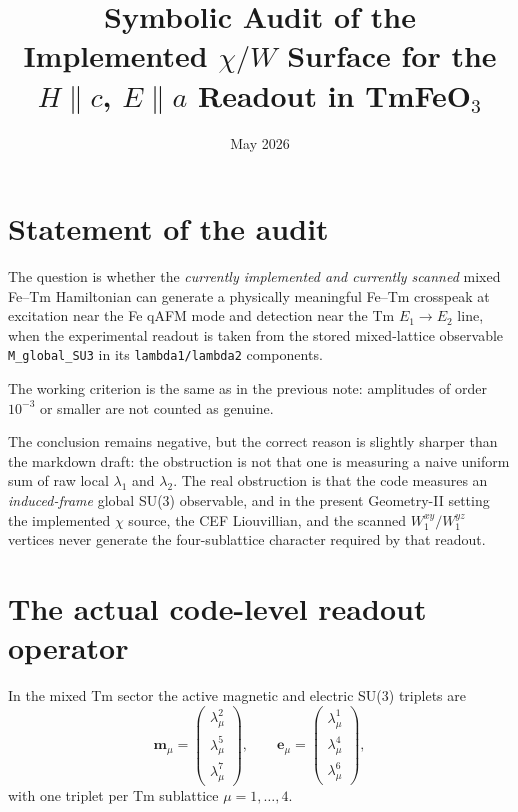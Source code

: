 \documentclass[11pt]{article}
\newcommand{\mtrip}{\bm{m}}
\newcommand{\etrip}{\bm{e}}
\begin{document}
\title{Symbolic Audit of the Implemented $\chi/W$ Surface for the\texorpdfstring{ $H\parallel c$, $E\parallel a$ }{ H//c, E//a } Readout in TmFeO$_3$}
\author{}
\date{May 2026}

\maketitle

\section{Statement of the audit}

The question is whether the \emph{currently implemented and currently scanned}
mixed Fe--Tm Hamiltonian can generate a physically meaningful Fe--Tm crosspeak
at excitation near the Fe qAFM mode and detection near the Tm
$E_1 \rightarrow E_2$ line, when the experimental readout is taken from the
stored mixed-lattice observable \texttt{M\_global\_SU3} in its
\texttt{lambda1/lambda2} components.

The working criterion is the same as in the previous note: amplitudes of order
$10^{-3}$ or smaller are not counted as genuine.

The conclusion remains negative, but the correct reason is slightly sharper than
the markdown draft: the obstruction is not that one is measuring a naive
uniform sum of raw local $\lambda_1$ and $\lambda_2$. The real obstruction is
that the code measures an \emph{induced-frame} global SU(3) observable, and in
the present Geometry-II setting the implemented $\chi$ source, the CEF
Liouvillian, and the scanned $W_1^{xy}/W_1^{yz}$ vertices never generate the
four-sublattice character required by that readout.

\section{The actual code-level readout operator}

In the mixed Tm sector the active magnetic and electric SU(3) triplets are
\begin{equation}
\mtrip_\mu =
\begin{pmatrix}
\lambda_\mu^2 \\
\lambda_\mu^5 \\
\lambda_\mu^7
\end{pmatrix},
\qquad
\etrip_\mu =
\begin{pmatrix}
\lambda_\mu^1 \\
\lambda_\mu^4 \\
\lambda_\mu^6
\end{pmatrix},
\end{equation}
with one triplet per Tm sublattice $\mu=1,\dots,4$.
\end{document}
